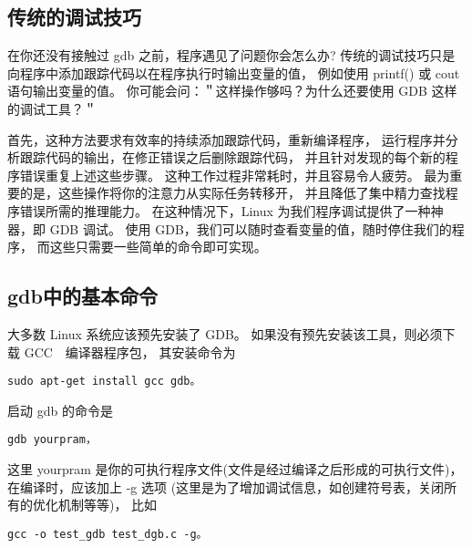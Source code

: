 
\subsection{传统的调试技巧}

在你还没有接触过 gdb 之前，程序遇见了问题你会怎么办?
传统的调试技巧只是向程序中添加跟踪代码以在程序执行时输出变量的值，
例如使用 printf() 或 cout 语句输出变量的值。
你可能会问：＂这样操作够吗？为什么还要使用 GDB 这样的调试工具？＂

首先，这种方法要求有效率的持续添加跟踪代码，重新编译程序，
运行程序并分析跟踪代码的输出，在修正错误之后删除跟踪代码，
并且针对发现的每个新的程序错误重复上述这些步骤。
这种工作过程非常耗时，并且容易令人疲劳。
最为重要的是，这些操作将你的注意力从实际任务转移开，
并且降低了集中精力查找程序错误所需的推理能力。
在这种情况下，Linux 为我们程序调试提供了一种神器，即 GDB 调试。
使用 GDB，我们可以随时查看变量的值，随时停住我们的程序，
而这些只需要一些简单的命令即可实现。

\subsection{gdb中的基本命令}
大多数 Linux 系统应该预先安装了 GDB。
如果没有预先安装该工具，则必须下载 GCC　编译器程序包，
其安装命令为
\begin{verbatim}
sudo apt-get install gcc gdb。
\end{verbatim}

启动 gdb 的命令是
\begin{verbatim}
gdb yourpram，
\end{verbatim}
这里 yourpram 是你的可执行程序文件(文件是经过编译之后形成的可执行文件)，
在编译时，应该加上 -g 选项
(这里是为了增加调试信息，如创建符号表，关闭所有的优化机制等等)，
比如
\begin{verbatim}
gcc -o test_gdb test_dgb.c -g。
\end{verbatim} 

